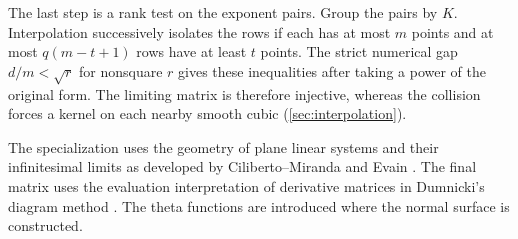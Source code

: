 The last step is a rank test on the exponent pairs. Group the pairs by $K$. Interpolation successively isolates the rows if each has at most $m$ points and at most $q(m-t+1)$ rows have at least $t$ points. The strict numerical gap $d/m<\sqrt r$ for nonsquare $r$ gives these inequalities after taking a power of the original form. The limiting matrix is therefore injective, whereas the collision forces a kernel on each nearby smooth cubic (\cref{sec:interpolation}).

The specialization uses the geometry of plane linear systems and their infinitesimal limits as developed by Ciliberto--Miranda and Evain \cite{CM1998,Evain2007}. The final matrix uses the evaluation interpretation of derivative matrices in Dumnicki's diagram method \cite[proof of Proposition~13]{Dumnicki2007}. The theta functions are introduced where the normal surface is constructed.
